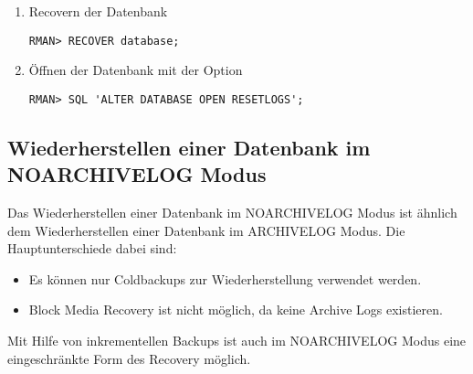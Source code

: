 \begin{enumerate}
            \item Recovern der Datenbank
              \begin{lstlisting}[caption={Recovern der Datenbank},label=admin1529,language=rman]
RMAN> RECOVER database;
              \end{lstlisting}
            \item \"Offnen der Datenbank mit der Option 
              \begin{lstlisting}[caption={Datenbank mit open resetlogs \"offnen},label=admin1530,language=rman,emph={[9]ALTER,DATABASE,OPEN,RESETLOGS},emphstyle={[9]\color{magenta}\bfseries}]
RMAN> SQL 'ALTER DATABASE OPEN RESETLOGS';
              \end{lstlisting}
            \end{enumerate}
      \subsection{Wiederherstellen einer Datenbank im NOARCHIVELOG Modus}
        Das Wiederherstellen einer Datenbank im NOARCHIVELOG Modus ist \"ahnlich dem Wiederherstellen einer Datenbank im ARCHIVELOG Modus. Die Hauptunterschiede dabei sind:
        \begin{itemize}
          \item Es k\"onnen nur Coldbackups zur Wiederherstellung verwendet werden.
          \item Block Media Recovery ist nicht m\"oglich, da keine Archive Logs existieren.
        \end{itemize}
        Mit Hilfe von inkrementellen Backups ist auch im NOARCHIVELOG Modus eine eingeschr\"ankte Form des Recovery m\"oglich.

